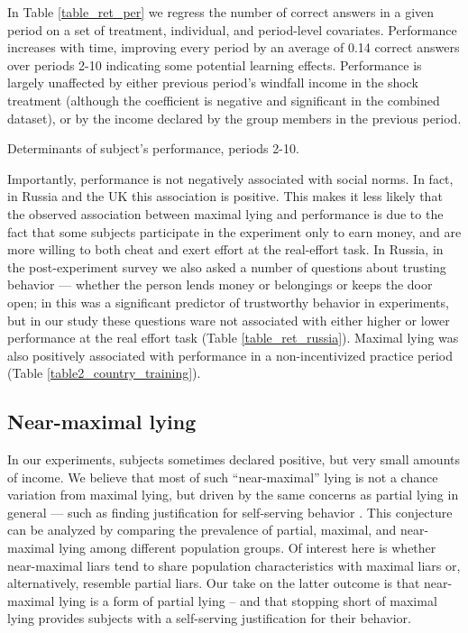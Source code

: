 \documentclass[12pt]{article}
\begin{document}
In Table \ref{table_ret_per} we regress the number of correct answers in a given period on a set of treatment, individual, and period-level covariates. Performance increases with time, improving every period by an average of 0.14 correct answers over periods 2-10 indicating some potential learning effects. %
Performance is largely unaffected by either previous period's windfall income in the shock treatment (although the coefficient is negative and significant in the combined dataset), or by the income declared by the group members in the previous period. 
\begin{table}[ht]
\scriptsize
\begin{center}

\end{center}
\caption{Determinants of subject's performance, periods 2-10.}
\label{table_ret_per}
\end{table}

Importantly, performance is not negatively associated with social norms. In fact, in Russia and the UK this association is positive. This makes it less likely that the observed association between maximal lying and performance is due to the fact that some subjects participate in the experiment only to earn money, and are more willing to both cheat and exert effort at the real-effort task. In Russia, in the post-experiment survey we also asked a number of questions about 
trusting behavior --- whether the person lends money or belongings or keeps the door open; in 
\cite{glaeser2000measuring} this was a significant predictor of trustworthy behavior in experiments, but in our study these questions ware not associated with either higher or lower performance at the real effort task (Table \ref{table_ret_russia}). Maximal lying was also positively associated with performance in a non-incentivized practice period (Table \ref{table2_country_training}). 

\subsection{Near-maximal lying}
\label{nearmax}

\par In our experiments, subjects sometimes declared positive, but very small amounts of income. We believe that most of such ``near-maximal'' lying is not a chance variation from maximal lying, but driven by the same concerns as partial lying in general --- such as finding justification for self-serving behavior \citep{GinoAriely2016}. This conjecture can be analyzed by comparing the prevalence of partial, maximal, and near-maximal lying among different population groups. Of interest here is whether near-maximal liars tend to share population characteristics with maximal liars or, alternatively, resemble partial liars. Our take on the latter outcome is that near-maximal lying is a form of partial lying -- and that stopping short of maximal lying provides subjects with a self-serving justification for their behavior.  
 
\end{document}
